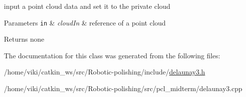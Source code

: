 input a point cloud data and set it to the private cloud 


\begin{DoxyParams}[1]{Parameters}
\mbox{\tt in}  & {\em cloud\+In} & reference of a point cloud \\
\hline
\end{DoxyParams}
\begin{DoxyReturn}{Returns}
none 
\end{DoxyReturn}


The documentation for this class was generated from the following files\+:\begin{DoxyCompactItemize}
\item 
/home/viki/catkin\+\_\+ws/src/\+Robotic-\/polishing/include/\hyperlink{delaunay3_8h}{delaunay3.\+h}\item 
/home/viki/catkin\+\_\+ws/src/\+Robotic-\/polishing/src/pcl\+\_\+midterm/delaunay3.\+cpp\end{DoxyCompactItemize}
